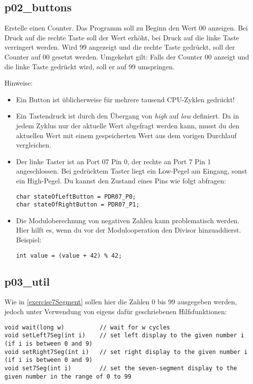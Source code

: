 \subsection{p02\_buttons}
Erstelle einen Counter.
Das Programm soll zu Beginn den Wert 00 anzeigen.
Bei Druck auf die rechte Taste soll der Wert erhöht, bei Druck auf die linke Taste verringert werden.
Wird 99 angezeigt und die rechte Taste gedrückt, soll der Counter auf 00 gesetzt werden.
Umgekehrt gilt:
Falls der Counter 00 anzeigt und die linke Taste gedrückt wird, soll er auf 99 umspringen.

Hinweise:\begin{itemize}
\item
Ein Button ist üblicherweise für mehrere tausend CPU-Zyklen gedrückt!

\item
Ein Tastendruck ist durch den Übergang von \emph{high} auf \emph{low} definiert.
Da in jedem Zyklus nur der aktuelle Wert abgefragt werden kann, musst du den aktuellen Wert mit einem gespeicherten Wert aus dem vorigen Durchlauf vergleichen.

\item
Der linke Taster ist an Port 07 Pin 0, der rechte an Port 7 Pin 1 angeschlossen.
Bei gedrücktem Taster liegt ein Low-Pegel am Eingang, sonst ein High-Pegel.
Du kannst den Zustand eines Pins wie folgt abfragen:
\begin{lstlisting}
char stateOfLeftButton = PDR07_P0; 
char stateOfRightButton = PDR07_P1;
\end{lstlisting}

\item
Die Moduloberechnung von negativen Zahlen kann problematisch werden.
Hier hilft es, wenn du vor der Modulooperation den Divisor hinzuaddierst.
Beispiel:
\begin{lstlisting}
int value = (value + 42) % 42;
\end{lstlisting}

\end{itemize}

\subsection{p03\_util}
\label{exercise7SegmentUtil}
Wie in \ref{exercise7Segment} sollen hier die Zahlen 0 bis 99 ausgegeben werden, jedoch unter Verwendung von eigens dafür geschriebenen Hilfsfunktionen:
\begin{lstlisting}
void wait(long w)          // wait for w cycles
void setLeft7Seg(int i)    // set left display to the given number i (if i is between 0 and 9)
void setRight7Seg(int i)   // set right display to the given number i (if i is between 0 and 9)
void set7Seg(int i)        // set the seven-segment display to the given number in the range of 0 to 99
\end{lstlisting}

